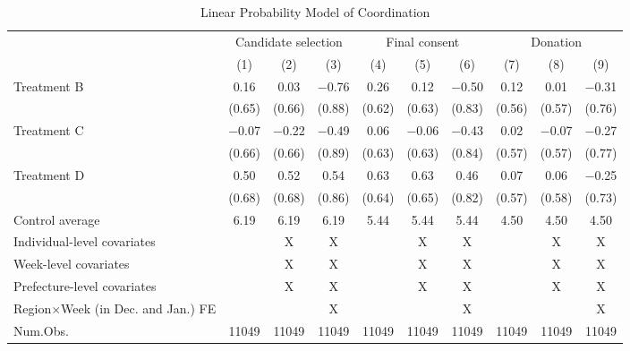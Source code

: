 \documentclass[12pt, a4paper]{article}
\begin{document}
\begin{table}[H]

\caption{\label{tab:coordinate-reg}Linear Probability Model of Coordination}
\centering
\fontsize{8}{10}\selectfont
\begin{threeparttable}
\begin{tabular}[t]{lccccccccc}
\toprule
\multicolumn{1}{c}{ } & \multicolumn{3}{c}{Candidate selection} & \multicolumn{3}{c}{Final consent} & \multicolumn{3}{c}{Donation} \\
\cmidrule(l{3pt}r{3pt}){2-4} \cmidrule(l{3pt}r{3pt}){5-7} \cmidrule(l{3pt}r{3pt}){8-10}
  & (1) & (2) & (3) & (4) & (5) & (6) & (7) & (8) & (9)\\
\midrule
Treatment B & \num{0.16} & \num{0.03} & \num{-0.76} & \num{0.26} & \num{0.12} & \num{-0.50} & \num{0.12} & \num{0.01} & \num{-0.31}\\
 & (\num{0.65}) & (\num{0.66}) & (\num{0.88}) & (\num{0.62}) & (\num{0.63}) & (\num{0.83}) & (\num{0.56}) & (\num{0.57}) & (\num{0.76})\\
Treatment C & \num{-0.07} & \num{-0.22} & \num{-0.49} & \num{0.06} & \num{-0.06} & \num{-0.43} & \num{0.02} & \num{-0.07} & \num{-0.27}\\
 & (\num{0.66}) & (\num{0.66}) & (\num{0.89}) & (\num{0.63}) & (\num{0.63}) & (\num{0.84}) & (\num{0.57}) & (\num{0.57}) & (\num{0.77})\\
Treatment D & \num{0.50} & \num{0.52} & \num{0.54} & \num{0.63} & \num{0.63} & \num{0.46} & \num{0.07} & \num{0.06} & \num{-0.25}\\
 & (\num{0.68}) & (\num{0.68}) & (\num{0.86}) & (\num{0.64}) & (\num{0.65}) & (\num{0.82}) & (\num{0.57}) & (\num{0.58}) & (\num{0.73})\\
\midrule
Control average & 6.19 & 6.19 & 6.19 & 5.44 & 5.44 & 5.44 & 4.50 & 4.50 & 4.50\\
Individual-level covariates &  & X & X &  & X & X &  & X & X\\
Week-level covariates &  & X & X &  & X & X &  & X & X\\
Prefecture-level covariates &  & X & X &  & X & X &  & X & X\\
Region$\times$Week (in Dec. and Jan.) FE &  &  & X &  &  & X &  &  & X\\
Num.Obs. & \num{11049} & \num{11049} & \num{11049} & \num{11049} & \num{11049} & \num{11049} & \num{11049} & \num{11049} & \num{11049}\\
\bottomrule
\end{tabular}
\begin{tablenotes}

\end{tablenotes}
\end{threeparttable}
\end{table}
\end{document}
